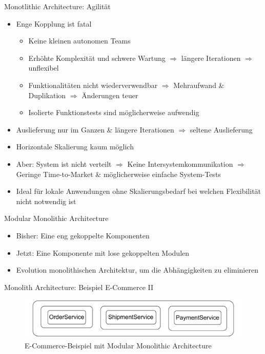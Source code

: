 \begin{frame}{Monotlithic Architecture: Agilität}
    \begin{itemize}
        \item Enge Kopplung ist fatal
        \begin{itemize}
            \item Keine kleinen autonomen Teams
            \item Erhöhte Komplexität und schwere Wartung $\Rightarrow$ längere Iterationen $\Rightarrow$ unflexibel
            \item Funktionalitäten nicht wiederverwendbar $\Rightarrow$ Mehraufwand \& Duplikation $\Rightarrow$ Änderungen teuer
            \item Isolierte Funktionstests sind möglicherweise aufwendig
        \end{itemize}
        \item Auslieferung nur im Ganzen \& längere Iterationen $\Rightarrow$ seltene Auslieferung
        \item Horizontale Skalierung kaum möglich
        \item Aber: System ist nicht verteilt $\Rightarrow$ Keine Intersystemkommunikation $\Rightarrow$ Geringe Time-to-Market \& möglicherweise einfache System-Tests
        \item Ideal für lokale Anwendungen ohne Skalierungsbedarf bei welchen Flexibilität nicht notwendig ist
    \end{itemize}
\end{frame}


\begin{frame}{Modular Monolithic Architecture}
    \begin{itemize}
       \item Bisher: Eine eng gekoppelte Komponenten
       \item Jetzt: Eine Komponente mit lose gekoppelten Modulen
       \item Evolution monolithischen Architektur, um die Abhängigkeiten zu eliminieren
     \end{itemize}
\end{frame}

\begin{frame}{Monolith Architecture: Beispiel E-Commerce II}
    \begin{figure}[!h]
        \centering
        \includegraphics[scale=0.70]{imglib/mono/mono-example}
        \caption{E-Commerce-Beispiel mit Modular Monolithic Architecture}
        \label{fig:mono-modular}
    \end{figure}
\end{frame}


